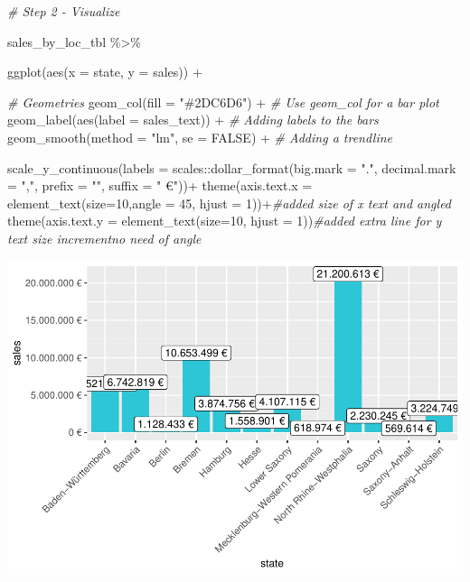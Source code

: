\documentclass[
]{article}
\newenvironment{Shaded}{\begin{snugshade}}{\end{snugshade}}
\newcommand{\AttributeTok}[1]{\textcolor[rgb]{0.77,0.63,0.00}{#1}}
\newcommand{\CommentTok}[1]{\textcolor[rgb]{0.56,0.35,0.01}{\textit{#1}}}
\newcommand{\ConstantTok}[1]{\textcolor[rgb]{0.00,0.00,0.00}{#1}}
\newcommand{\DecValTok}[1]{\textcolor[rgb]{0.00,0.00,0.81}{#1}}
\newcommand{\FunctionTok}[1]{\textcolor[rgb]{0.00,0.00,0.00}{#1}}
\newcommand{\NormalTok}[1]{#1}
\newcommand{\SpecialCharTok}[1]{\textcolor[rgb]{0.00,0.00,0.00}{#1}}
\newcommand{\StringTok}[1]{\textcolor[rgb]{0.31,0.60,0.02}{#1}}
\begin{document}
\begin{Shaded}
\begin{Highlighting}[]
  \CommentTok{\# Step 2 {-} Visualize}
 
\NormalTok{  sales\_by\_loc\_tbl }\SpecialCharTok{\%\textgreater{}\%}
  

  \FunctionTok{ggplot}\NormalTok{(}\FunctionTok{aes}\NormalTok{(}\AttributeTok{x =}\NormalTok{ state, }\AttributeTok{y =}\NormalTok{ sales)) }\SpecialCharTok{+}


  \CommentTok{\# Geometries}
  \FunctionTok{geom\_col}\NormalTok{(}\AttributeTok{fill =} \StringTok{"\#2DC6D6"}\NormalTok{) }\SpecialCharTok{+} \CommentTok{\# Use geom\_col for a bar plot}
  \FunctionTok{geom\_label}\NormalTok{(}\FunctionTok{aes}\NormalTok{(}\AttributeTok{label =}\NormalTok{ sales\_text)) }\SpecialCharTok{+} \CommentTok{\# Adding labels to the bars}
  \FunctionTok{geom\_smooth}\NormalTok{(}\AttributeTok{method =} \StringTok{"lm"}\NormalTok{, }\AttributeTok{se =} \ConstantTok{FALSE}\NormalTok{) }\SpecialCharTok{+} \CommentTok{\# Adding a trendline}


  \FunctionTok{scale\_y\_continuous}\NormalTok{(}\AttributeTok{labels =}\NormalTok{ scales}\SpecialCharTok{::}\FunctionTok{dollar\_format}\NormalTok{(}\AttributeTok{big.mark =} \StringTok{"."}\NormalTok{, }
                                                    \AttributeTok{decimal.mark =} \StringTok{","}\NormalTok{, }
                                                    \AttributeTok{prefix =} \StringTok{""}\NormalTok{, }
                                                    \AttributeTok{suffix =} \StringTok{" €"}\NormalTok{))}\SpecialCharTok{+}
  \FunctionTok{theme}\NormalTok{(}\AttributeTok{axis.text.x =} \FunctionTok{element\_text}\NormalTok{(}\AttributeTok{size=}\DecValTok{10}\NormalTok{,}\AttributeTok{angle =} \DecValTok{45}\NormalTok{, }\AttributeTok{hjust =} \DecValTok{1}\NormalTok{))}\SpecialCharTok{+}\CommentTok{\#added size of x text and angled}
  \FunctionTok{theme}\NormalTok{(}\AttributeTok{axis.text.y =} \FunctionTok{element\_text}\NormalTok{(}\AttributeTok{size=}\DecValTok{10}\NormalTok{, }\AttributeTok{hjust =} \DecValTok{1}\NormalTok{))}\CommentTok{\#added extra line for y text size incrementno need of angle}
\end{Highlighting}
\end{Shaded}

\includegraphics{01_tidyverse_files/figure-latex/unnamed-chunk-2-1.pdf}
\end{document}
